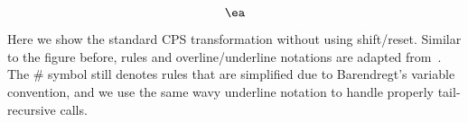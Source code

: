\documentclass[acmsmall,10pt,review,anonymous]{acmart}\settopmatter{printfolios=true,printccs=false,printacmref=false}
\begin{document}
\begin{figure}[h]
$$%
\ea
$$
\end{figure}
\vspace{-2ex}
\flushleft
\begin{footnotesize}
Here we show the standard CPS transformation without using shift/reset.
Similar to the figure before, rules and overline/underline notations are adapted from~\citet{DBLP:journals/mscs/DanvyF92}.
The \# symbol still denotes rules that are simplified due to Barendregt's variable convention,
and we use the same wavy underline notation to handle properly tail-recursive calls.
\end{footnotesize}
\vspace{2ex}
\end{document}
